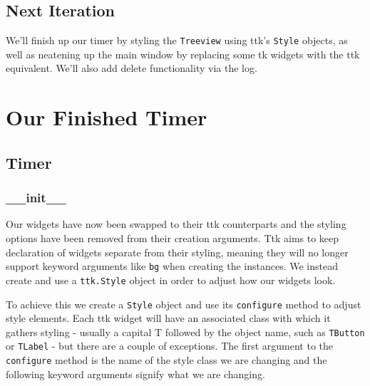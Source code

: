\documentclass[a4paper,11pt,openany]{book}
\begin{document}
\subsection{Next Iteration}

We'll finish up our timer by styling the \lstinline[columns=fixed]{Treeview} using ttk's \lstinline[columns=fixed]{Style} objects, as well as neatening up the main window by replacing some tk widgets with the ttk equivalent. We'll also add delete functionality via the log. 

\newpage

\section{Our Finished Timer}



\subsection{Timer}

\subsubsection{\_\_init\_\_}

Our widgets have now been swapped to their ttk counterparts and the styling options have been removed from their creation arguments. Ttk aims to keep declaration of widgets separate from their styling, meaning they will no longer support keyword arguments like \lstinline[columns=fixed]{bg} when creating the instances. We instead create and use a \lstinline[columns=fixed]{ttk.Style} object in order to adjust how our widgets look.

\vspace{5mm}

To achieve this we create a \lstinline[columns=fixed]{Style} object and use its \lstinline[columns=fixed]{configure} method to adjust style elements. Each ttk widget will have an associated class with which it gathers styling - usually a capital T followed by the object name, such as \lstinline[columns=fixed]{TButton} or \lstinline[columns=fixed]{TLabel} - but there are a couple of exceptions. The first argument to the \lstinline[columns=fixed]{configure} method is the name of the style class we are changing and the following keyword arguments signify what we are changing. 
\end{document}
